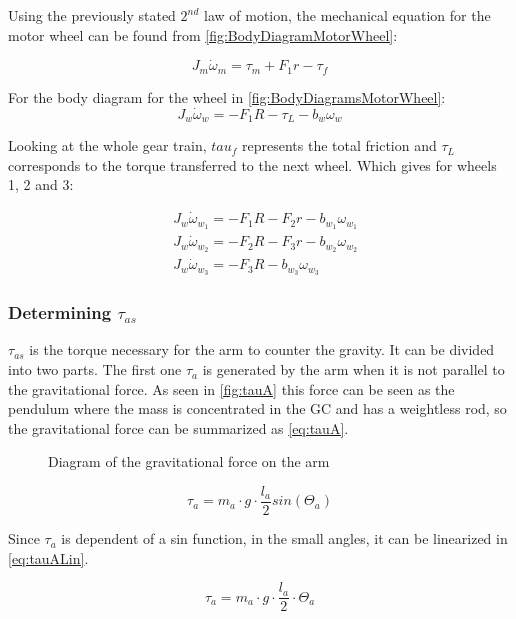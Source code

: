 Using the previously stated $2^{nd}$ law of motion, the mechanical equation for the motor wheel can be found from \autoref{fig:BodyDiagramMotorWheel}:

\begin{equation}
    J_m \dot{\omega}_m = \tau_m + F_1r - \tau_f
\end{equation}

For the body diagram for the wheel in \autoref{fig:BodyDiagramsMotorWheel}:
\begin{equation}
	J_w\dot{\omega}_w = -F_1R -\tau_L -b_w\omega_w
\end{equation}

Looking at the whole gear train, $tau_f$ represents the total friction and $\tau_L$ corresponds to the torque transferred to the next wheel. Which gives for wheels 1, 2 and 3:

\begin{subequations} 
	\begin{flalign}
		&J_w\dot{\omega}_{w_1} = -F_1R -F_2r -b_{w_1}\omega_{w_1} \\
		&J_w\dot{\omega}_{w_2} = -F_2R -F_3r -b_{w_2}\omega_{w_2} \\
		&J_w\dot{\omega}_{w_3}= -F_3R -b_{w_3}\omega_{w_3}
	\end{flalign}
\end{subequations}



\subsubsection*{Determining $\tau_{as}$}

$\tau_{as}$ is the torque necessary for the arm to counter the gravity. It can be divided into two parts. The first one $\tau_a$ is generated by the arm when it is not parallel to the gravitational force. As seen in \autoref{fig:tauA} this force can be seen as the pendulum where the mass is concentrated in the GC and has a weightless rod, so the gravitational force can be summarized as \autoref{eq:tauA}.

\begin{figure}[htbp]
	\caption{Diagram of the gravitational force on the arm}\label{fig:tauA}
\end{figure}

\begin{equation}\label{eq:tauA}
	\tau_a=m_a\cdot g \cdot \frac{l_a}{2} sin(\Theta_a)
\end{equation}
\startexplain
{}
\stopexplain

Since $\tau_a$ is dependent of a sin function, in the small angles, it can be linearized in \autoref{eq:tauALin}.

\begin{equation}\label{eq:tauALin}
\tau_a=m_a\cdot g \cdot \frac{l_a}{2}\cdot\Theta_a
\end{equation}